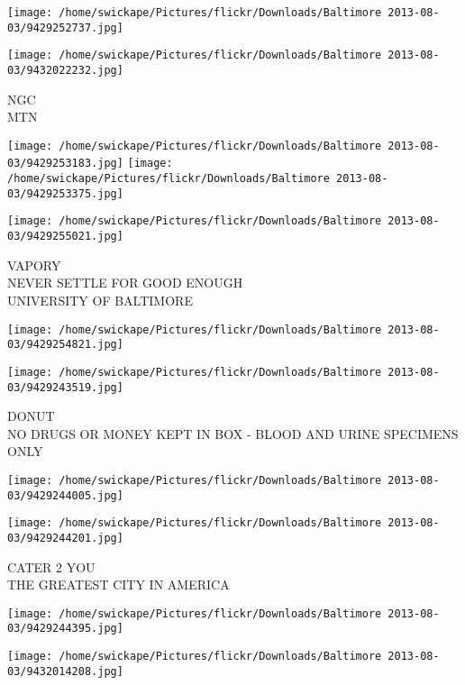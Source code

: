 \documentclass[10pt,letterpaper]{article}
\begin{document}
\texttt{[image: /home/swickape/Pictures/flickr/Downloads/Baltimore 2013-08-03/9429252737.jpg]}

\vspace{0.25in}
\texttt{[image: /home/swickape/Pictures/flickr/Downloads/Baltimore 2013-08-03/9432022232.jpg]}

NGC\\
MTN\\
\pagebreak

\texttt{[image: /home/swickape/Pictures/flickr/Downloads/Baltimore 2013-08-03/9429253183.jpg]}
\texttt{[image: /home/swickape/Pictures/flickr/Downloads/Baltimore 2013-08-03/9429253375.jpg]}

\vspace{0.25in}
\texttt{[image: /home/swickape/Pictures/flickr/Downloads/Baltimore 2013-08-03/9429255021.jpg]}

VAPORY\\
NEVER SETTLE FOR GOOD ENOUGH\\
UNIVERSITY OF BALTIMORE\\
\pagebreak

\texttt{[image: /home/swickape/Pictures/flickr/Downloads/Baltimore 2013-08-03/9429254821.jpg]}

\vspace{0.25in}
\texttt{[image: /home/swickape/Pictures/flickr/Downloads/Baltimore 2013-08-03/9429243519.jpg]}

DONUT\\
NO DRUGS OR MONEY KEPT IN BOX {-} BLOOD AND URINE SPECIMENS ONLY\\
\pagebreak

\texttt{[image: /home/swickape/Pictures/flickr/Downloads/Baltimore 2013-08-03/9429244005.jpg]}

\vspace{0.25in}
\texttt{[image: /home/swickape/Pictures/flickr/Downloads/Baltimore 2013-08-03/9429244201.jpg]}

CATER 2 YOU\\
THE GREATEST CITY IN AMERICA\\
\pagebreak

\texttt{[image: /home/swickape/Pictures/flickr/Downloads/Baltimore 2013-08-03/9429244395.jpg]}

\vspace{0.25in}
\texttt{[image: /home/swickape/Pictures/flickr/Downloads/Baltimore 2013-08-03/9432014208.jpg]}
\end{document}

